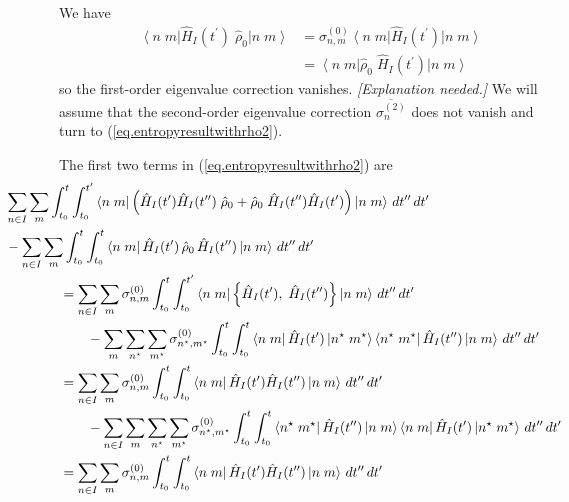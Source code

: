 \documentclass[11pt]{article}
\newcommand{\bra}[1]{\left\langle#1\right|}
\newcommand{\ket}[1]{\left|#1\right\rangle}
\newcommand{\op}[1]{\hat{#1}}
\newcommand{\bket}[2]{\ket{#1\;#2}}
\newcommand{\bbra}[2]{\bra{#1\;#2}}
\theoremstyle{theorem}
\theoremstyle{remark}
\theoremstyle{step}
\theoremstyle{gap}
\begin{document}
We have
\begin{align*}
\bbra{n}{m} \op{H}_I(t^\prime) \;\op{\rho}_0 \bket{n}{m} 
&= 
\sigma_{n,m}^{(0)} \bbra{n}{m} \op{H}_I(t^\prime) \bket{n}{m} 
\\&=
 \bbra{n}{m} \op{\rho}_0 \;\op{H}_I(t^\prime) \bket{n}{m} 
\end{align*}
so the first-order eigenvalue correction vanishes. \emph{[Explanation needed.]} We will assume that the second-order eigenvalue correction \(\overline{\sigma_n^{(2)}}\) does not vanish and turn to (\ref{eq.entropyresultwithrho2}).

The first two terms in (\ref{eq.entropyresultwithrho2}) are
\begin{align*}
&\hspace{-4em} \sum_{n \in I} \sum_m\int_{t_0}^t \int_{t_0}^{t^\prime} \bbra{n}{m} \left( \op{H}_I (t^\prime) \op{H}_I(t^{\prime\prime}) \;\op{\rho}_0 + \op{\rho}_0\; \op{H}_I (t^{\prime\prime}) \op{H}_I(t^{\prime}) \right) \bket{n}{m}\,dt^{\prime\prime}\,dt^\prime \\
&\hspace{-4em}- \sum_{n \in I}\sum_m\int_{t_0}^t \int_{t_0}^{t} \bbra{n}{m}\op{H}_I (t^\prime) \,\op{\rho}_0\, \op{H}_I (t^{\prime\prime})\bket{n}{m}\,dt^{\prime\prime}\,dt^\prime \\
&= \sum_{n \in I}\sum_m\sigma_{n,m}^{(0)} \int_{t_0}^t \int_{t_0}^{t^\prime} \bbra{n}{m} \left\{\op{H}_I (t^\prime),\; \op{H}_I(t^{\prime\prime}) \right\} \bket{n}{m}\,dt^{\prime\prime}\,dt^\prime \\
&\hspace{2em} -\sum_m\sum_{n^\star} \sum_{m^\star} \sigma_{n^\star,m^\star}^{(0)}\int_{t_0}^t \int_{t_0}^{t} \bbra{n}{m}\op{H}_I (t^\prime) \bket{n^\star}{m^\star}\bbra{n^\star}{m^\star} \op{H}_I (t^{\prime\prime})\bket{n}{m}\,dt^{\prime\prime}\,dt^\prime \\
&=\sum_{n \in I}\sum_m \sigma_{n,m}^{(0)} \int_{t_0}^t \int_{t_0}^{t} \bbra{n}{m}\op{H}_I (t^\prime) \op{H}_I(t^{\prime\prime}) \bket{n}{m}\,dt^{\prime\prime}\,dt^\prime \\
&\hspace{2em}-\sum_{n \in I}\sum_m\sum_{n^\star} \sum_{m^\star} \sigma_{n^\star,m^\star}^{(0)}\int_{t_0}^t \int_{t_0}^{t} \bbra{n^\star}{m^\star} \op{H}_I (t^{\prime\prime})\bket{n}{m} \bbra{n}{m}\op{H}_I (t^\prime) \bket{n^\star}{m^\star}\,dt^{\prime\prime}\,dt^\prime \\
&= \sum_{n \in I}\sum_m\sigma_{n,m}^{(0)} \int_{t_0}^t \int_{t_0}^{t} \bbra{n}{m}\op{H}_I (t^\prime) \op{H}_I(t^{\prime\prime}) \bket{n}{m}\,dt^{\prime\prime}\,dt^\prime \\

\end{align*}
\end{document}
